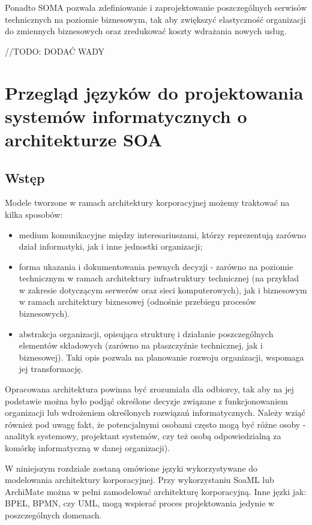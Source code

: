 Ponadto SOMA pozwala zdefiniowanie i zaprojektowanie poszczególnych serwisów technicznych na poziomie biznesowym, tak aby zwiększyć elastyczność organizacji do zmiennych biznesowych oraz zredukować koszty wdrażania nowych usług.

//TODO: DODAĆ WADY

\chapter{Przegląd języków do projektowania systemów informatycznych o architekturze SOA}

\section{Wstęp}
Modele tworzone w ramach architektury korporacyjnej możemy traktować na kilka sposobów:
\begin{itemize}
\item{medium komunikacyjne między interesariuszami, którzy reprezentują zarówno dział informatyki, jak i inne jednostki organizacji;}
\item{forma ukazania i dokumentowania pewnych decyzji - zarówno na poziomie technicznym w ramach architektury infrastruktury technicznej (na przykład w zakresie dotyczącym serwerów oraz sieci komputerowych), jak i biznesowym w ramach architektury biznesowej (odnośnie przebiegu procesów biznesowych).}
\item{abstrakcja organizacji, opisująca strukturę i działanie poszczególnych elementów składowych (zarówno na płaszczyźnie technicznej, jak i biznesowej). Taki opis pozwala na planowanie rozwoju organizacji, wspomaga jej transformację.}
\end{itemize}

Opracowana architektura powinna być zrozumiała dla odbiorcy, tak aby na jej podstawie można było podjąć określone decyzje związane z funkcjonowaniem organizacji lub wdrożeniem określonych rozwiązań informatycznych. Należy wziąć również pod uwagę fakt, że potencjalnymi osobami często mogą być różne osoby - analityk systemowy, projektant systemów, czy też osobą odpowiedzialną za komórkę informatyczną w danej organizacji).\cite{ArchKorpSob}

W niniejszym rozdziale zostaną omówione języki wykorzystywane do modelowania architektury korporacyjnej. Przy wykorzystaniu SoaML lub ArchiMate można w pełni zamodelować architekturę korporacyjną. Inne jęzki jak: BPEL, BPMN, czy UML, mogą wspierać proces projektowania jedynie w poszczególnych domenach.


